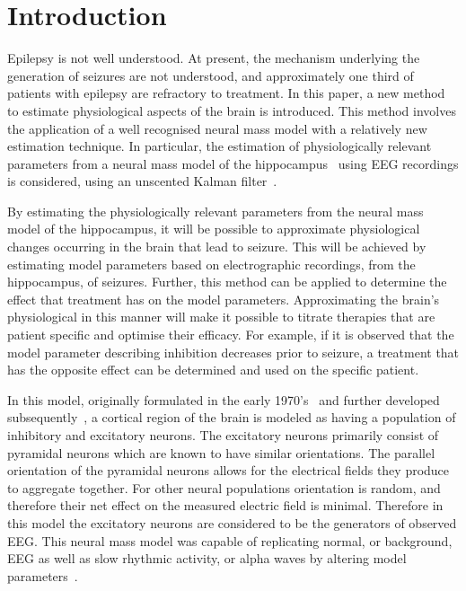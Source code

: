 \section{Introduction}


Epilepsy is not well understood. At present, the mechanism underlying the generation of seizures are not understood, and approximately one third of patients with epilepsy are refractory to treatment. In this paper, a new method to estimate physiological aspects of the brain is introduced. This method involves the application of a well recognised neural mass model with a relatively new estimation technique. In particular, the estimation of physiologically relevant parameters from a neural mass model of the hippocampus~\citep{wendling2002epileptic} using EEG recordings is considered, using an unscented Kalman filter~\citep{voss2004nonlinear}. 

By estimating the physiologically relevant parameters from the neural mass model of the hippocampus, it will be possible to approximate physiological changes occurring in the brain that lead to seizure. This will be achieved by estimating model parameters based on electrographic recordings, from the hippocampus, of seizures. Further, this method can be applied to determine the effect that treatment has on the model parameters. Approximating the brain's physiological in this manner will make it possible to titrate therapies that are patient specific and optimise their efficacy. For example, if it is observed that the model parameter describing inhibition decreases prior to seizure, a treatment that has the opposite effect can be determined and used on the specific patient.


In this model, originally formulated in the early 1970's~\citep{wilson1973mathematical,lopes1974model,freeman1963electrical} and further developed subsequently~\citep{jansen1995electroencephalogram}, a cortical region of the brain is modeled as having a population of inhibitory and excitatory neurons. The excitatory neurons primarily consist of pyramidal neurons which are known to have similar orientations. The parallel orientation of the pyramidal neurons allows for the electrical fields they produce to aggregate together. For other neural populations orientation is random, and therefore their net effect on the measured electric field is minimal. Therefore in this model the excitatory neurons are considered to be the generators of observed EEG. This neural mass model was capable of replicating normal, or background, EEG as well as slow rhythmic activity, or alpha waves by altering model parameters~\citep{jansen1995electroencephalogram}.

